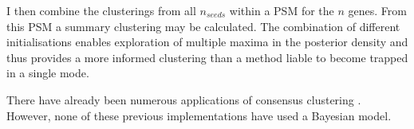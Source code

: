 \documentclass[12pt]{article} %
\begin{document}
	I then combine the clusterings from all $n_{seeds}$ within a PSM for the $n$ genes.  From this PSM a summary clustering may be calculated. The combination of different initialisations enables exploration of multiple maxima in the posterior density and thus provides a more informed clustering than a method liable to become trapped in a single mode. 
	
	
	There have already been numerous applications of consensus clustering \citep{LiWeightedConsensusClustering2008, LancichinettiConsensusclusteringcomplex2012, BreimanRandomForests2001}. However, none of these previous implementations have used a Bayesian model. 
	

\end{document}
